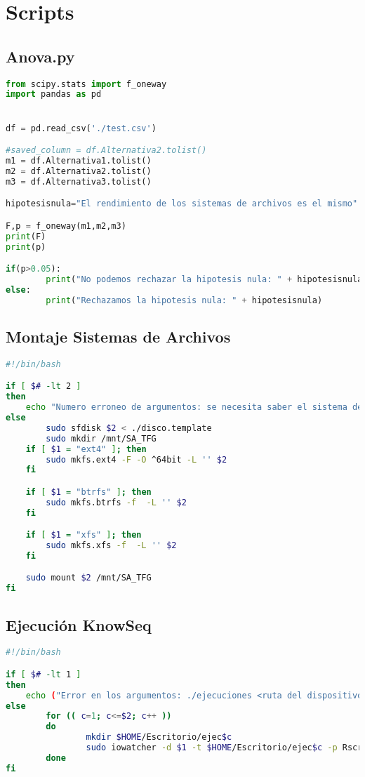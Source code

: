 \chapter{Scripts}

\section{Anova.py}\label{Anova.py}
\begin{lstlisting}[language=python]
from scipy.stats import f_oneway
import pandas as pd


df = pd.read_csv('./test.csv')

#saved_column = df.Alternativa2.tolist()
m1 = df.Alternativa1.tolist()
m2 = df.Alternativa2.tolist()
m3 = df.Alternativa3.tolist()

hipotesisnula="El rendimiento de los sistemas de archivos es el mismo"

F,p = f_oneway(m1,m2,m3)
print(F)
print(p)

if(p>0.05):
        print("No podemos rechazar la hipotesis nula: " + hipotesisnula)
else:
        print("Rechazamos la hipotesis nula: " + hipotesisnula)

\end{lstlisting}

\section{Montaje Sistemas de Archivos}\label{montaje.sh}
\begin{lstlisting}[language=bash]
#!/bin/bash

if [ $# -lt 2 ]
then
	echo "Numero erroneo de argumentos: se necesita saber el sistema de archivos, la ruta del dispositivo"
else
		sudo sfdisk $2 < ./disco.template
		sudo mkdir /mnt/SA_TFG 
	if [ $1 = "ext4" ]; then
		sudo mkfs.ext4 -F -O ^64bit -L '' $2
	fi

	if [ $1 = "btrfs" ]; then
		sudo mkfs.btrfs -f  -L '' $2
	fi

	if [ $1 = "xfs" ]; then
		sudo mkfs.xfs -f  -L '' $2
	fi

	sudo mount $2 /mnt/SA_TFG
fi
\end{lstlisting}

\section{Ejecución KnowSeq}\label{knowseq.sh}
\begin{lstlisting}[language=bash]
#!/bin/bash

if [ $# -lt 1 ]
then
	echo ("Error en los argumentos: ./ejecuciones <ruta del dispositivo> <n-ejecuciones>")
else
        for (( c=1; c<=$2; c++ ))
        do  
                mkdir $HOME/Escritorio/ejec$c
                sudo iowatcher -d $1 -t $HOME/Escritorio/ejec$c -p Rscript filesystemKnowSeqTest.R
        done
fi
   
\end{lstlisting}